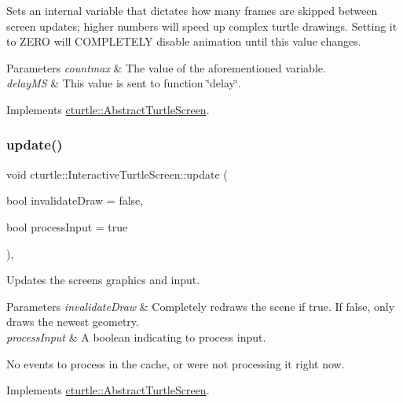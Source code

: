 Sets an internal variable that dictates how many frames are skipped between screen updates; higher numbers will speed up complex turtle drawings. Setting it to Z\+E\+RO will C\+O\+M\+P\+L\+E\+T\+E\+LY disable animation until this value changes. 
\begin{DoxyParams}{Parameters}
{\em countmax} & The value of the aforementioned variable. \\
\hline
{\em delay\+MS} & This value is sent to function \char`\"{}delay\char`\"{}. \\
\hline
\end{DoxyParams}


Implements \hyperlink{classcturtle_1_1AbstractTurtleScreen}{cturtle\+::\+Abstract\+Turtle\+Screen}.

\mbox{\label{classcturtle_1_1InteractiveTurtleScreen_adfefb43645347feb832072f8fc8da144}} 
\subsubsection{\texorpdfstring{update()}{update()}}
{\footnotesize\ttfamily void cturtle\+::\+Interactive\+Turtle\+Screen\+::update (\begin{DoxyParamCaption}\item[{bool}]{invalidate\+Draw = {\ttfamily false},  }\item[{bool}]{process\+Input = {\ttfamily true} }\end{DoxyParamCaption})\hspace{0.3cm}{\ttfamily [inline]}, {\ttfamily [virtual]}}

Updates the screen\textquotesingle{}s graphics and input. 
\begin{DoxyParams}{Parameters}
{\em invalidate\+Draw} & Completely redraws the scene if true. If false, only draws the newest geometry. \\
\hline
{\em process\+Input} & A boolean indicating to process input. \\
\hline
\end{DoxyParams}
No events to process in the cache, or we\textquotesingle{}re not processing it right now. 

Implements \hyperlink{classcturtle_1_1AbstractTurtleScreen}{cturtle\+::\+Abstract\+Turtle\+Screen}.


